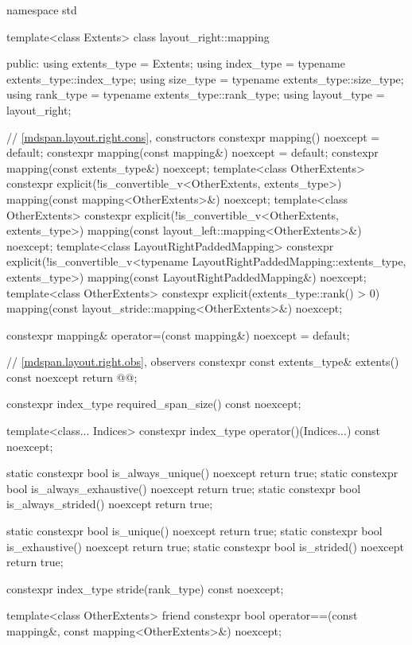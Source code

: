 \begin{codeblock}
namespace std {
  template<class Extents>
  class layout_right::mapping {
  public:
    using extents_type = Extents;
    using index_type = typename extents_type::index_type;
    using size_type = typename extents_type::size_type;
    using rank_type = typename extents_type::rank_type;
    using layout_type = layout_right;

    // \ref{mdspan.layout.right.cons}, constructors
    constexpr mapping() noexcept = default;
    constexpr mapping(const mapping&) noexcept = default;
    constexpr mapping(const extents_type&) noexcept;
    template<class OtherExtents>
      constexpr explicit(!is_convertible_v<OtherExtents, extents_type>)
        mapping(const mapping<OtherExtents>&) noexcept;
    template<class OtherExtents>
      constexpr explicit(!is_convertible_v<OtherExtents, extents_type>)
        mapping(const layout_left::mapping<OtherExtents>&) noexcept;
    template<class LayoutRightPaddedMapping>
      constexpr explicit(!is_convertible_v<typename LayoutRightPaddedMapping::extents_type,
                                           extents_type>)
        mapping(const LayoutRightPaddedMapping&) noexcept;
    template<class OtherExtents>
      constexpr explicit(extents_type::rank() > 0)
        mapping(const layout_stride::mapping<OtherExtents>&) noexcept;

    constexpr mapping& operator=(const mapping&) noexcept = default;

    // \ref{mdspan.layout.right.obs}, observers
    constexpr const extents_type& extents() const noexcept { return @@; }

    constexpr index_type required_span_size() const noexcept;

    template<class... Indices>
      constexpr index_type operator()(Indices...) const noexcept;

    static constexpr bool is_always_unique() noexcept { return true; }
    static constexpr bool is_always_exhaustive() noexcept { return true; }
    static constexpr bool is_always_strided() noexcept { return true; }

    static constexpr bool is_unique() noexcept { return true; }
    static constexpr bool is_exhaustive() noexcept { return true; }
    static constexpr bool is_strided() noexcept { return true; }

    constexpr index_type stride(rank_type) const noexcept;

    template<class OtherExtents>
      friend constexpr bool operator==(const mapping&, const mapping<OtherExtents>&) noexcept;

}}
\end{codeblock}
